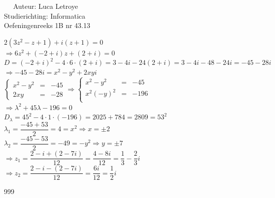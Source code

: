 \documentclass[a4paper]{article}
\begin{document}
  
\noindent \large Auteur: Luca Letroye \\
\noindent \large Studierichting: Informatica\\
\noindent \large Oefeningenreeks 1B nr 43.13\\

\medskip

\normalsize

$2(3z^2 - z + 1) + i(z+1) = 0$\\

$ \Rightarrow 6z^2 + (-2+i)z + (2+i) = 0$\\

$D = {(-2+i)}^2 -4 \cdot 6 \cdot (2+i) = 3-4i - 24(2+i) = 3-4i - 48 - 24i = -45-28i  $\\

$\Rightarrow -45-28i = x^2 - y^2 + 2xyi$ \\

$
\left\{
    \begin{array}{lll} 
        x^2 - y^2 &=& -45 \\
        2xy &=& -28
    \end{array}
\right.
\Rightarrow
\left\{
    \begin{array}{lll} 
        x^2 - y^2 &=& -45\\
        x^2(-y)^2 &=& -196\\
    \end{array}
\right.
$\\

$\Rightarrow \lambda^2 + 45\lambda - 196 = 0$\\

$ D_\lambda = 45^2 -4 \cdot 1 \cdot (-196) = 2025 + 784 = 2809 = 53^2$\\

$\lambda_1 = \dfrac{-45+53}{2} = 4 = x^2 \Rightarrow x = \pm 2$\\

$\lambda_2 = \dfrac{-45-53}{2} = -49 = -y^2 \Rightarrow y = \pm 7$\\

$\Rightarrow z_1 = \dfrac{2-i+(2-7i)}{12} = \dfrac{4-8i}{12} = \dfrac{1}{3} - \dfrac{2}{3}i$\\

$\Rightarrow z_2 = \dfrac{2-i - (2-7i) }{12} = \dfrac{6i}{12} = \dfrac{1}{2}i$\\




\begin{thebibliography}{999}
\end{thebibliography}
\end{document}
